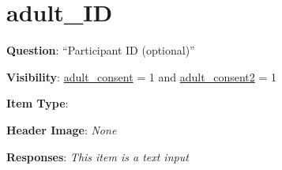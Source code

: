 \documentclass[]{book}
\begin{document}
\hypertarget{adult_id}{%
\section{adult\_ID}\label{adult_id}}

\textbf{Question}: ``Participant ID (optional)''

\textbf{Visibility}: \protect\hyperlink{adult_consent}{adult\_consent} = 1 and \protect\hyperlink{adult_consent2}{adult\_consent2} = 1

\textbf{Item Type}:

\textbf{Header Image}: \emph{None}

\textbf{Responses}: \emph{This item is a text input}


\end{document}
